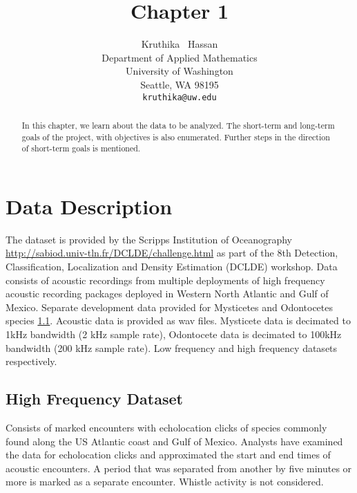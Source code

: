 \documentclass[final]{article}
\title{Chapter 1}
\author{
  Kruthika ~Hassan \\%
  Department of Applied Mathematics\\
  University of Washington\\
  Seattle, WA 98195 \\
  \texttt{kruthika@uw.edu} \\
}
\begin{document}

\maketitle

\begin{abstract}
  In this chapter, we learn about the data to be analyzed. The short-term and long-term goals of the project, with objectives is also enumerated. Further steps in the direction of short-term goals is mentioned.
\end{abstract}

\section{Data Description}
The dataset is provided by the Scripps Institution of Oceanography \url{http://sabiod.univ-tln.fr/DCLDE/challenge.html} as part of the 8th Detection, Classification, Localization and Density Estimation (DCLDE) workshop. Data consists of acoustic recordings from multiple deployments of high frequency acoustic recording packages deployed in Western North Atlantic and Gulf of Mexico. Separate development data provided for Mysticetes and Odontocetes species \ref{}. Acoustic data is provided as wav files. Mysticete data  is decimated to 1kHz bandwidth (2 kHz sample rate), Odontocete data is decimated to 100kHz bandwidth (200 kHz sample rate). Low frequency and high frequency datasets respectively. 

\subsection{High Frequency Dataset}
Consists of marked encounters with echolocation clicks of species commonly found along the US Atlantic coast and Gulf of Mexico. Analysts have examined the data for echolocation clicks and approximated the start and end times of acoustic encounters. A period that was separated from another by five minutes or more is marked as a separate encounter. Whistle activity is not considered. 
\end{document}
